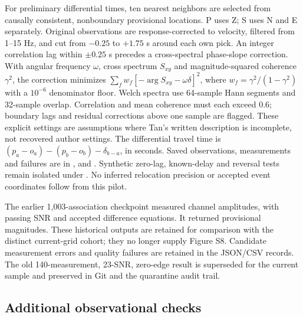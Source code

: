 For preliminary differential times, ten nearest neighbors are selected from causally consistent, nonboundary provisional locations. P uses Z; S uses N and E separately. Original observations are response-corrected to velocity, filtered from 1--15 Hz, and cut from $-0.25$ to $+1.75$ s around each own pick. An integer correlation lag within $\pm0.25$ s precedes a cross-spectral phase-slope correction. With angular frequency $\omega$, cross spectrum $S_{xy}$ and magnitude-squared coherence $\gamma^2$, the correction minimizes $\sum_f w_f[-\arg S_{xy}-\omega\delta]^2$, where $w_f=\gamma^2/(1-\gamma^2)$ with a $10^{-6}$ denominator floor. Welch spectra use 64-sample Hann segments and 32-sample overlap. Correlation and mean coherence must each exceed 0.6; boundary lags and residual corrections above one sample are flagged. These explicit settings are assumptions where Tan's written description is incomplete, not recovered author settings. The differential travel time is $(p_a-o_a)-(p_b-o_b)-\delta_{b-a}$, in seconds. Saved observations, measurements and failures are in ,  and . Synthetic zero-lag, known-delay and reversal tests remain isolated under . No inferred relocation precision or accepted event coordinates follow from this pilot.

The earlier 1,003-association checkpoint measured \CurrentAmplitudes{} channel amplitudes, with \CurrentSNR{} passing SNR and \CurrentMagnitudeEdges{} accepted difference equations. It returned \CurrentMagnitudes{} provisional magnitudes. These historical outputs are retained for comparison with the distinct current-grid cohort; they no longer supply Figure S8. Candidate measurement errors and quality failures are retained in the JSON/CSV records. The old 140-measurement, 23-SNR, zero-edge result is superseded for the current sample and preserved in Git and the quarantine audit trail.

\subsection*{Additional observational checks}


